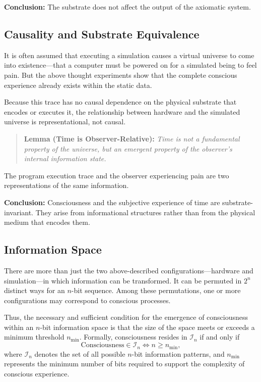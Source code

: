 \documentclass[11pt]{article}
\begin{document}
\textbf{Conclusion:} The substrate does not affect the output of the axiomatic system.



\subsection{Causality and Substrate Equivalence}

It is often assumed that executing a simulation causes a virtual universe to come into existence—that a computer 
must be powered on for a simulated being to feel pain. But the above thought experiments show that the complete 
conscious experience already exists within the static data.

Because this trace has no causal dependence on the physical substrate that encodes or executes it, the relationship 
between hardware and the simulated universe is representational, not causal.

\begin{quote}
  \textbf{Lemma (Time is Observer-Relative):} \emph{Time is not a fundamental property of the universe, but an 
  emergent property of the observer’s internal information state.}
\end{quote}

The program execution trace and the observer experiencing pain are two representations of the same information.

\textbf{Conclusion:} Consciousness and the subjective experience of time are substrate-invariant. They arise from 
informational structures rather than from the physical medium that encodes them.



\subsection{Information Space}

There are more than just the two above-described configurations—hardware and simulation—in which information can be transformed.
It can be permuted in $2^n$ distinct ways for an $n$-bit sequence. Among these permutations, 
one or more configurations may correspond to conscious processes.

Thus, the necessary and sufficient condition for the emergence of consciousness within an $n$-bit information space is that the size of the space meets or exceeds a minimum threshold $n_{\min}$. Formally, consciousness resides in $\mathcal{I}_n$ if and only if
\[
  \text{Consciousness} \in \mathcal{I}_n \iff n \geq n_{\min},
\]
where $\mathcal{I}_n$ denotes the set of all possible $n$-bit information patterns, and $n_{\min}$ represents 
the minimum number of bits required to support the complexity of conscious experience.
\end{document}
